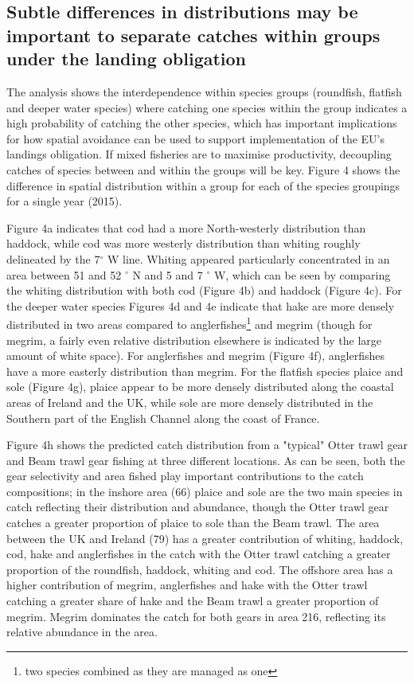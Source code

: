 \documentclass{nature}
\begin{document}
\begin{linenumbers}
\subsection{Subtle differences in distributions may be important to separate
	catches within groups under the landing obligation} 
The analysis shows the interdependence within species groups (roundfish,
flatfish and deeper water species) where catching one species within the group
indicates a high probability of catching the other species, which has important
implications for how spatial avoidance can be used to support implementation of
the EU's landings obligation. If mixed fisheries are to maximise productivity,
decoupling catches of species between and within the groups will be key.
Figure 4 shows the difference in spatial distribution within a group for each
of the species groupings for a single year (2015). 

Figure 4a indicates that cod had a more North-westerly distribution than
haddock, while cod was more westerly distribution than whiting roughly
delineated by the 7$^{\circ}$ W line. Whiting appeared particularly
concentrated in an area between 51 and 52 $^{\circ}$ N and 5 and 7 $^{\circ}$
W, which can be seen by comparing the whiting distribution with both cod
(Figure 4b) and haddock (Figure 4c). For the deeper water species Figures 4d
and 4e indicate that hake are more densely distributed in two areas compared to
anglerfishes\footnote{two species combined as they are managed as one} and
megrim (though for megrim, a fairly even relative distribution elsewhere is
indicated by the large amount of white space). For anglerfishes and megrim
(Figure 4f), anglerfishes have a more easterly distribution than megrim. For
the flatfish species plaice and sole (Figure 4g), plaice appear to be more
densely distributed along the coastal areas of Ireland and the UK, while sole
are more densely distributed in the Southern part of the English Channel along
the coast of France.

Figure 4h shows the predicted catch distribution from a "typical" Otter trawl
gear and Beam trawl gear fishing at three different locations. As can be seen,
both the gear selectivity and area fished play important contributions to the
catch compositions; in the inshore area (66) plaice and sole are the two main
species in catch reflecting their distribution and abundance, though the Otter
trawl gear catches a greater proportion of plaice to sole than the Beam trawl.
The area between the UK and Ireland (79) has a greater contribution of whiting,
haddock, cod, hake and anglerfishes in the catch with the Otter trawl catching
a greater proportion of the roundfish, haddock, whiting and cod. The offshore
area has a higher contribution of megrim, anglerfishes and hake with the Otter
trawl catching a greater share of hake and the Beam trawl a greater proportion
of megrim. Megrim dominates the catch for both gears in area 216, reflecting
its relative abundance in the area.


\end{linenumbers}
\end{document}
